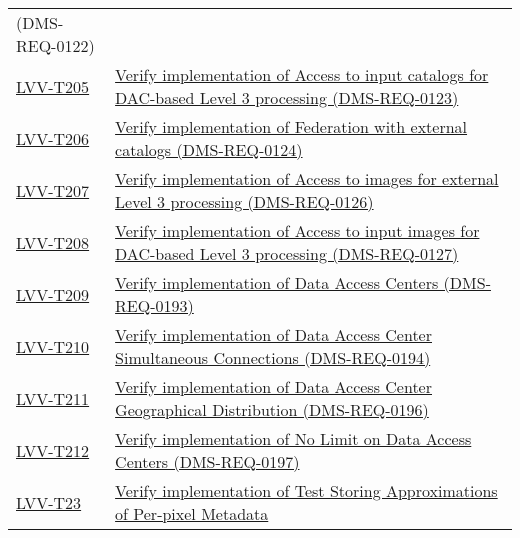\begin{longtable}[]{@{}ll@{}}
{(DMS-REQ-0122)}\tabularnewline
\protect\hyperlink{lvv-t205---verify-implementation-of-access-to-input-catalogs-for-dac-based-level-3-processing-dms-req-0123}{LVV-T205}
&
\href{https://jira.lsstcorp.org/secure/Tests.jspa\#/testCase/LVV-T205}{Verify
implementation of Access to input catalogs for DAC-based Level 3
processing (DMS-REQ-0123)}\tabularnewline
\protect\hyperlink{lvv-t206---verify-implementation-of-federation-with-external-catalogs-dms-req-0124}{LVV-T206}
&
\href{https://jira.lsstcorp.org/secure/Tests.jspa\#/testCase/LVV-T206}{Verify
implementation of Federation with external catalogs
(DMS-REQ-0124)}\tabularnewline
\protect\hyperlink{lvv-t207---verify-implementation-of-access-to-images-for-external-level-3-processing-dms-req-0126}{LVV-T207}
&
\href{https://jira.lsstcorp.org/secure/Tests.jspa\#/testCase/LVV-T207}{Verify
implementation of Access to images for external Level 3 processing
(DMS-REQ-0126)}\tabularnewline
\protect\hyperlink{lvv-t208---verify-implementation-of-access-to-input-images-for-dac-based-level-3-processing-dms-req-0127}{LVV-T208}
&
\href{https://jira.lsstcorp.org/secure/Tests.jspa\#/testCase/LVV-T208}{Verify
implementation of Access to input images for DAC-based Level 3
processing (DMS-REQ-0127)}\tabularnewline
\protect\hyperlink{lvv-t209---verify-implementation-of-data-access-centers-dms-req-0193}{LVV-T209}
&
\href{https://jira.lsstcorp.org/secure/Tests.jspa\#/testCase/LVV-T209}{Verify
implementation of Data Access Centers (DMS-REQ-0193)}\tabularnewline
\protect\hyperlink{lvv-t210---verify-implementation-of--data-access-center-simultaneous-connections-dms-req-0194}{LVV-T210}
&
\href{https://jira.lsstcorp.org/secure/Tests.jspa\#/testCase/LVV-T210}{Verify
implementation of Data Access Center Simultaneous Connections
(DMS-REQ-0194)}\tabularnewline
\protect\hyperlink{lvv-t211---verify-implementation-of-data-access-center-geographical-distribution-dms-req-0196}{LVV-T211}
&
\href{https://jira.lsstcorp.org/secure/Tests.jspa\#/testCase/LVV-T211}{Verify
implementation of Data Access Center Geographical Distribution
(DMS-REQ-0196)}\tabularnewline
\protect\hyperlink{lvv-t212---verify-implementation-of-no-limit-on-data-access-centers-dms-req-0197}{LVV-T212}
&
\href{https://jira.lsstcorp.org/secure/Tests.jspa\#/testCase/LVV-T212}{Verify
implementation of No Limit on Data Access Centers
(DMS-REQ-0197)}\tabularnewline
\protect\hyperlink{lvv-t23---verify-implementation-of-test-storing-approximations-of-per-pixel-metadata-dms-req-0326}{LVV-T23}
&
\href{https://jira.lsstcorp.org/secure/Tests.jspa\#/testCase/LVV-T23}{Verify
implementation of Test Storing Approximations of Per-pixel Metadata
}
\end{longtable}
